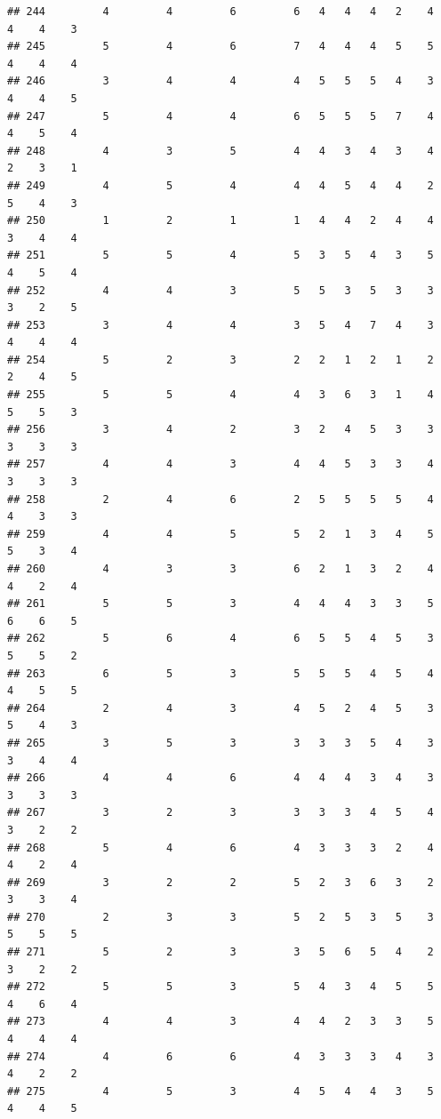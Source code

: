 \documentclass[
]{article}
\begin{document}
\begin{verbatim}
## 244         4         4         6         6   4   4   4   2    4    4    4    3
## 245         5         4         6         7   4   4   4   5    5    4    4    4
## 246         3         4         4         4   5   5   5   4    3    4    4    5
## 247         5         4         4         6   5   5   5   7    4    4    5    4
## 248         4         3         5         4   4   3   4   3    4    2    3    1
## 249         4         5         4         4   4   5   4   4    2    5    4    3
## 250         1         2         1         1   4   4   2   4    4    3    4    4
## 251         5         5         4         5   3   5   4   3    5    4    5    4
## 252         4         4         3         5   5   3   5   3    3    3    2    5
## 253         3         4         4         3   5   4   7   4    3    4    4    4
## 254         5         2         3         2   2   1   2   1    2    2    4    5
## 255         5         5         4         4   3   6   3   1    4    5    5    3
## 256         3         4         2         3   2   4   5   3    3    3    3    3
## 257         4         4         3         4   4   5   3   3    4    3    3    3
## 258         2         4         6         2   5   5   5   5    4    4    3    3
## 259         4         4         5         5   2   1   3   4    5    5    3    4
## 260         4         3         3         6   2   1   3   2    4    4    2    4
## 261         5         5         3         4   4   4   3   3    5    6    6    5
## 262         5         6         4         6   5   5   4   5    3    5    5    2
## 263         6         5         3         5   5   5   4   5    4    4    5    5
## 264         2         4         3         4   5   2   4   5    3    5    4    3
## 265         3         5         3         3   3   3   5   4    3    3    4    4
## 266         4         4         6         4   4   4   3   4    3    3    3    3
## 267         3         2         3         3   3   3   4   5    4    3    2    2
## 268         5         4         6         4   3   3   3   2    4    4    2    4
## 269         3         2         2         5   2   3   6   3    2    3    3    4
## 270         2         3         3         5   2   5   3   5    3    5    5    5
## 271         5         2         3         3   5   6   5   4    2    3    2    2
## 272         5         5         3         5   4   3   4   5    5    4    6    4
## 273         4         4         3         4   4   2   3   3    5    4    4    4
## 274         4         6         6         4   3   3   3   4    3    4    2    2
## 275         4         5         3         4   5   4   4   3    5    4    4    5

\end{verbatim}
\end{document}
